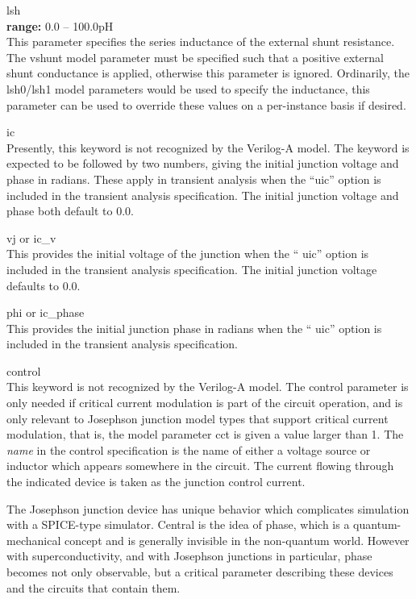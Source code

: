 \begin{description}
\item{\vt lsh}\\
{\bf range:} 0.0 -- 100.0pH\\
This parameter specifies the series inductance of the external shunt
resistance.  The {\vt vshunt} model parameter must be specified such
that a positive external shunt conductance is applied, otherwise this
parameter is ignored.  Ordinarily, the {\vt lsh0}/{\vt lsh1} model
parameters would be used to specify the inductance, this parameter can
be used to override these values on a per-instance basis if desired.

\item{\vt ic}\\
Presently, this keyword is not recognized by the Verilog-A model.  The
keyword is expected to be followed by two numbers, giving the initial
junction voltage and phase in radians.  These apply in transient
analysis when the ``{\vt uic}'' option is included in the transient
analysis specification.  The initial junction voltage and phase both
default to 0.0.

\item{{\vt vj} or {\vt ic\_v}}\\
This provides the initial voltage of the junction when the ``{\vt
uic}'' option is included in the transient analysis specification. 
The initial junction voltage defaults to 0.0.

\item{{\vt phi} or {\vt ic\_phase}}\\
This provides the initial junction phase in radians when the ``{\vt
uic}'' option is included in the transient analysis specification.

\item{\vt control}\\
This keyword is not recognized by the Verilog-A model.  The {\vt
control} parameter is only needed if critical current modulation is
part of the circuit operation, and is only relevant to Josephson
junction model types that support critical current modulation, that
is, the model parameter {\vt cct} is given a value larger than 1.  The
{\it name} in the {\vt control} specification is the name of either a
voltage source or inductor which appears somewhere in the circuit. 
The current flowing through the indicated device is taken as the
junction control current.
\end{description}

The Josephson junction device has unique behavior which complicates
simulation with a SPICE-type simulator.  Central is the idea of phase,
which is a quantum-mechanical concept and is generally invisible in
the non-quantum world.  However with superconductivity, and with
Josephson junctions in particular, phase becomes not only observable,
but a critical parameter describing these devices and the circuits
that contain them.

